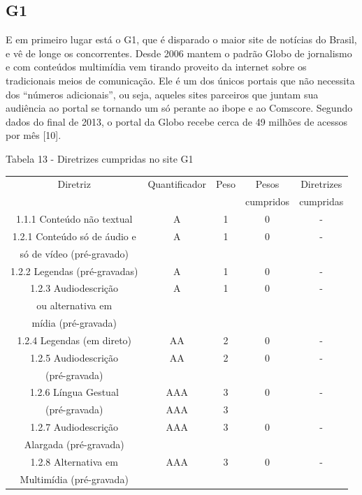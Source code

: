 \documentclass[a4paper]{article}
\begin{document}
\begin{titlepage}
\subsection{G1}

E em primeiro lugar está o G1, que é disparado o maior site de notícias do Brasil, e vê de longe os concorrentes. Desde 2006 mantem o padrão Globo de jornalismo e com conteúdos multimídia vem tirando proveito da internet sobre os tradicionais meios de comunicação. Ele é um dos únicos portais que não necessita dos “números adicionais”, ou seja, aqueles sites parceiros que juntam sua audiência ao portal se tornando um só perante ao ibope e ao Comscore. Segundo dados do final de 2013, o portal da Globo recebe cerca de 49 milhões de acessos por mês [10].

Tabela 13 - Diretrizes cumpridas no site G1\\[-1cm]
\begin{center}
	\fontsize{8pt}{8pt}\selectfont	
	\begin{longtable}{|c|c|c|c|c|}
		\hline
		Diretriz & Quantificador & Peso & Pesos & Diretrizes\\
		& & & cumpridos & cumpridas\\
		\hline
		1.1.1 Conteúdo não textual & A & 1 & 0 & - \\
		\hline
		1.2.1 Conteúdo só de áudio e & A & 1 & 0 & - \\
		só de vídeo (pré-gravado) & & & & \\
		\hline
		1.2.2 Legendas (pré-gravadas) & A & 1 & 0 & - \\
		\hline
		1.2.3 Audiodescrição & A & 1 & 0 & - \\
		ou alternativa em & & & & \\
		mídia (pré-gravada) & & & & \\
		\hline
		1.2.4 Legendas (em direto) & AA & 2 & 0 & - \\
		\hline
		1.2.5 Audiodescrição & AA & 2 & 0 & - \\
		(pré-gravada) & & & & \\
		\hline
		1.2.6 Língua Gestual & AAA & 3 & 0 & - \\
		(pré-gravada) & AAA & 3 & & \\
		\hline
		1.2.7 Audiodescrição & AAA & 3 & 0 & - \\
		Alargada (pré-gravada) & & & & \\
		\hline
		1.2.8 Alternativa em & AAA & 3 & 0 & - \\
		Multimídia (pré-gravada) & & & & \\

\end{longtable}
\end{center}
\end{titlepage}
\end{document}
